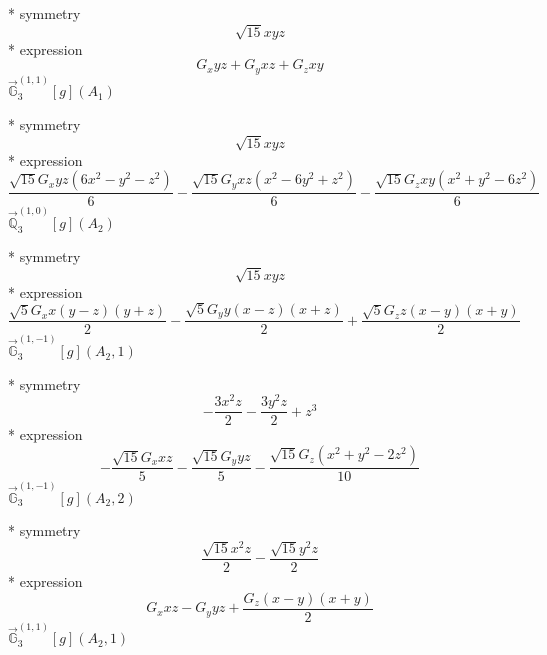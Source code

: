 \documentclass[fleqn,8pt]{jsarticle}
\begin{document}
\noindent\quad ** symmetry
\begin{dmath*}
\sqrt{15} x y z
\end{dmath*}
\noindent\quad ** expression
\begin{dmath*}
G_{x} y z + G_{y} x z + G_{z} x y
\end{dmath*}
\noindent\quad $\vec{\mathbb{G}}_{3}^{(1,1)}[g](A_{1})$

\noindent\quad ** symmetry
\begin{dmath*}
\sqrt{15} x y z
\end{dmath*}
\noindent\quad ** expression
\begin{dmath*}
\frac{\sqrt{15} G_{x} y z \left(6 x^{2} - y^{2} - z^{2}\right)}{6} - \frac{\sqrt{15} G_{y} x z \left(x^{2} - 6 y^{2} + z^{2}\right)}{6} - \frac{\sqrt{15} G_{z} x y \left(x^{2} + y^{2} - 6 z^{2}\right)}{6}
\end{dmath*}
\noindent\quad $\vec{\mathbb{Q}}_{3}^{(1,0)}[g](A_{2})$

\noindent\quad ** symmetry
\begin{dmath*}
\sqrt{15} x y z
\end{dmath*}
\noindent\quad ** expression
\begin{dmath*}
\frac{\sqrt{5} G_{x} x \left(y - z\right) \left(y + z\right)}{2} - \frac{\sqrt{5} G_{y} y \left(x - z\right) \left(x + z\right)}{2} + \frac{\sqrt{5} G_{z} z \left(x - y\right) \left(x + y\right)}{2}
\end{dmath*}
\noindent\quad $\vec{\mathbb{G}}_{3}^{(1,-1)}[g](A_{2},1)$

\noindent\quad ** symmetry
\begin{dmath*}
- \frac{3 x^{2} z}{2} - \frac{3 y^{2} z}{2} + z^{3}
\end{dmath*}
\noindent\quad ** expression
\begin{dmath*}
- \frac{\sqrt{15} G_{x} x z}{5} - \frac{\sqrt{15} G_{y} y z}{5} - \frac{\sqrt{15} G_{z} \left(x^{2} + y^{2} - 2 z^{2}\right)}{10}
\end{dmath*}
\noindent\quad $\vec{\mathbb{G}}_{3}^{(1,-1)}[g](A_{2},2)$

\noindent\quad ** symmetry
\begin{dmath*}
\frac{\sqrt{15} x^{2} z}{2} - \frac{\sqrt{15} y^{2} z}{2}
\end{dmath*}
\noindent\quad ** expression
\begin{dmath*}
G_{x} x z - G_{y} y z + \frac{G_{z} \left(x - y\right) \left(x + y\right)}{2}
\end{dmath*}
\noindent\quad $\vec{\mathbb{G}}_{3}^{(1,1)}[g](A_{2},1)$
\end{document}
